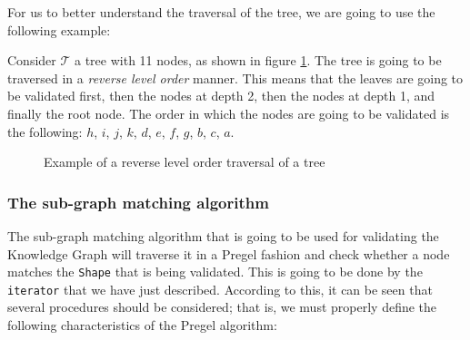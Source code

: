 For us to better understand the traversal of the tree, we are going to use the following example:

\begin{example}
    Consider $\mathcal{T}$ a tree with 11 nodes, as shown in figure \ref{fig:tree_traversal}. The tree is going to be traversed in a \textit{reverse level order} manner. This means that the leaves are going to be validated first, then the nodes at depth 2, then the nodes at depth 1, and finally the root node. The order in which the nodes are going to be validated is the following: $h$, $i$, $j$, $k$, $d$, $e$, $f$, $g$, $b$, $c$, $a$.
    \begin{figure}[ht]
        \centering
        
        \caption{Example of a reverse level order traversal of a tree}
        \label{fig:tree_traversal}
    \end{figure}
\end{example}

\subsubsection{The sub-graph matching algorithm}

The sub-graph matching algorithm that is going to be used for validating the Knowledge Graph will traverse it in a Pregel fashion and check whether a node matches the \texttt{Shape} that is being validated. This is going to be done by the \texttt{iterator} that we have just described. According to this, it can be seen that several procedures should be considered; that is, we must properly define the following characteristics of the Pregel algorithm:

